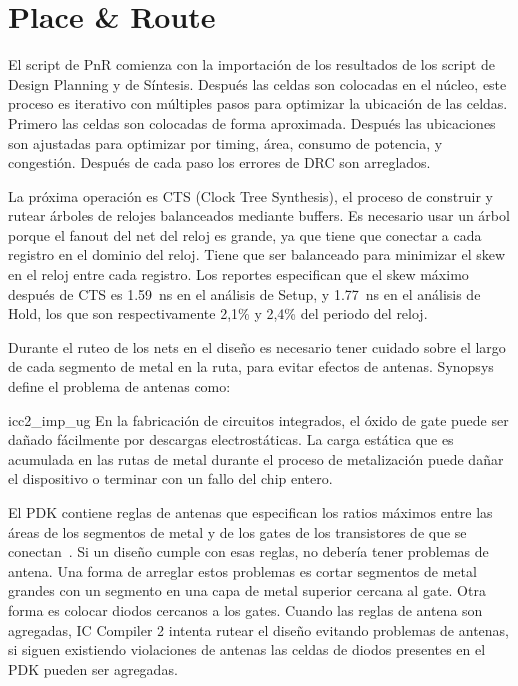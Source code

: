 \documentclass[a4paper, twoside, 11pt]{report}
\begin{document}
\FloatBarrier
\section{Place \& Route}

El script de PnR comienza con la importación de los resultados de los script de Design Planning y de Síntesis. Después las celdas son colocadas en el núcleo, este proceso es iterativo con múltiples pasos para optimizar la ubicación de las celdas. Primero las celdas son colocadas de forma aproximada. Después las ubicaciones son ajustadas para optimizar por timing, área, consumo de potencia, y congestión. Después de cada paso los errores de DRC son arreglados.

La próxima operación es CTS (Clock Tree Synthesis), el proceso de construir y rutear árboles de relojes balanceados mediante buffers. Es necesario usar un árbol porque el fanout del net del reloj es grande, ya que tiene que conectar a cada registro en el dominio del reloj. Tiene que ser balanceado para minimizar el skew en el reloj entre cada registro. Los reportes especifican que el skew máximo después de CTS es \SI{1.59}{\nano\second} en el análisis de Setup, y \SI{1.77}{\nano\second} en el análisis de Hold, los que son respectivamente 2,1\% y 2,4\% del periodo del reloj.

Durante el ruteo de los nets en el diseño es necesario tener cuidado sobre el largo de cada segmento de metal en la ruta, para evitar efectos de antenas. Synopsys define el problema de antenas como:

\begin{displaycquote}[traducido de][]{icc2_imp_ug}
  En la fabricación de circuitos integrados, el óxido de gate puede ser dañado fácilmente por descargas electrostáticas. La carga estática que es acumulada en las rutas de metal durante el proceso de metalización puede dañar el dispositivo o terminar con un fallo del chip entero.
\end{displaycquote}

El PDK contiene reglas de antenas que especifican los ratios máximos entre las áreas de los segmentos de metal y de los gates de los transistores de que se conectan~\cite{xh018_design_rules}. Si un diseño cumple con esas reglas, no debería tener problemas de antena. Una forma de arreglar estos problemas es cortar segmentos de metal grandes con un segmento en una capa de metal superior cercana al gate. Otra forma es colocar diodos cercanos a los gates. Cuando las reglas de antena son agregadas, IC Compiler 2 intenta rutear el diseño evitando problemas de antenas, si siguen existiendo violaciones de antenas las celdas de diodos presentes en el PDK pueden ser agregadas.
\end{document}

